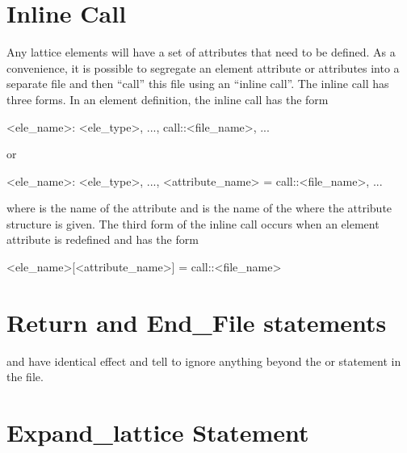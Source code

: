 {%
\section{Inline Call}
\label{s:call.inline}

Any lattice elements will have a set of attributes that need to be defined.
As a convenience, it is possible to segregate an element attribute or attributes
into a separate file and then ``call'' this file using an
``inline call''. The inline call has three forms. In an element definition,
the inline call has the form
\begin{example}
  <ele_name>: <ele_type>, ..., call::<file_name>, ...
\end{example}
or
\begin{example}
  <ele_name>: <ele_type>, ..., <attribute_name> = call::<file_name>, ...
\end{example}
where  is the name of the attribute and
 is the name of the where the attribute structure is
given.  The third form of the inline call occurs when an element
attribute is redefined and has the form
\begin{example}
  <ele_name>[<attribute_name>] = call::<file_name>
\end{example}



\section{Return and End_File statements}

 and  have identical effect and tell \bmad to
ignore anything beyond the  or  statement in
the file.

\section{Expand_lattice Statement}
\label{s:expand}

}
